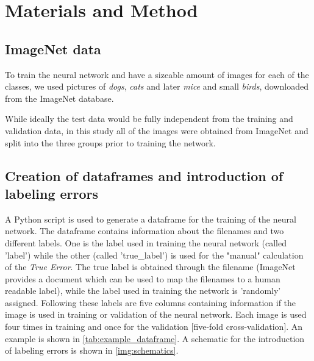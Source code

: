 \documentclass[a4paper,11pt]{scrartcl}
\theoremstyle{definition}
\begin{document}

\section{Materials and Method}
\subsection{ImageNet data}
To train the neural network and have a sizeable amount of images for each of the classes, we used pictures of \emph{dogs}, \emph{cats} and later \emph{mice} and small \emph{birds}, downloaded from the ImageNet database.
\begin{tcolorbox}[colback=red!5,colframe=red!40!black,title=Disclaimer regarding validation and test data]
	While ideally the test data would be fully independent from the training and validation data, in this study all of the images were obtained from ImageNet and split into the three groups prior to training the network.
\end{tcolorbox}\label{test}
\subsection[Data-frame creation]{Creation of dataframes and introduction of labeling errors}
A Python script is used to generate a dataframe for the training of the neural network.
The dataframe contains information about the filenames and two different labels.
One is the label used in training the neural network (called 'label') while the other (called 'true\_label') is used for the "manual" calculation of the \emph{True Error}.
The true label is obtained through the filename (ImageNet provides a document which can be used to map the filenames to a human readable label), while the label used in training the network is 'randomly' assigned.
Following these labels are five columns containing information if the image is used in training or validation of the neural network.
Each image is used four times in training and once for the validation [five-fold cross-validation].
An example is shown in \autoref{tab:example_dataframe}. %
A schematic for the introduction of labeling errors is shown in \autoref{img:schematics}.
\end{document}
